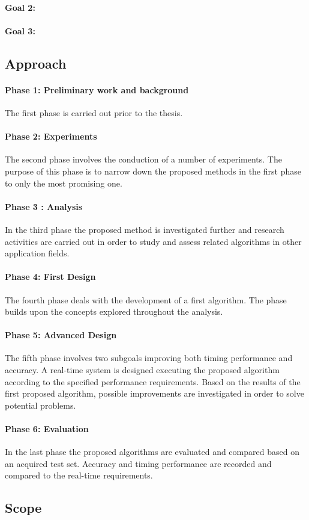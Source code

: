 \paragraph{Goal 2:}

\paragraph{Goal 3:}

\subsection{Approach}
 
\paragraph{Phase 1: Preliminary work and background}
 The first phase is carried out prior to the thesis. 
\paragraph{Phase 2: Experiments}
 The second phase involves the conduction of a number of experiments. The purpose of this phase is to narrow down the proposed methods in the first phase to only the most promising one.
\paragraph{Phase 3 : Analysis}
 In the third phase the proposed method is investigated further and research activities are
 carried out in order to study and assess related algorithms in other application fields.
\paragraph{Phase 4: First Design}
 The fourth phase deals with the development of a first algorithm. The phase
 builds upon the concepts explored throughout the analysis.
\paragraph{Phase 5: Advanced Design}
 The fifth phase involves two subgoals improving both timing performance and accuracy. A
 real-time system is designed executing the proposed algorithm according to the specified
 performance requirements. Based on the results of the first proposed algorithm, possible
 improvements are investigated in order to solve potential problems.
\paragraph{Phase 6: Evaluation}
 In the last phase the proposed algorithms are evaluated and compared based on an acquired
 test set. Accuracy and timing performance are recorded and compared to the real-time
 requirements.
 
 \subsection{Scope}
 